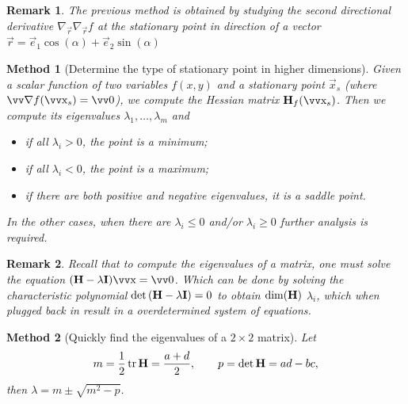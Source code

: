 \documentclass[twocolumn, margin=normal]{tex/hsrzf}
\theoremstyle{fuvarzf}
\newtheorem{method}{Method}
\newtheorem{remark}{Remark}
\DeclareMathOperator{\tr}{\mathrm{tr}}
\begin{document}
\begin{remark}
  The previous method is obtained by studying the second directional derivative
  \(\nabla_\vec{r}\nabla_\vec{r} f\) at the stationary point in direction of a
  vector \(\vec{r} = \vec{e}_1\cos(\alpha) + \vec{e}_2\sin(\alpha)\)
\end{remark}

\begin{method}[Determine the type of stationary point in higher dimensions]
  Given a scalar function of two variables \(f(x,y)\) and a stationary point
  \(\vec{x}_s\) (where \(\grad f(\vec{x}_s) = \vec{0}\)), we compute the
  Hessian matrix \(\mx{H}_f(\vec{x}_s)\). Then we compute its eigenvalues
  \(\lambda_1, \ldots, \lambda_m\) and
  \begin{itemize}
    \item if all \(\lambda_i > 0\), the point is a minimum;
    \item if all \(\lambda_i < 0\), the point is a maximum;
    \item if there are both positive and negative eigenvalues,
      it is a saddle point.
  \end{itemize}
  In the other cases, when there are \(\lambda_i \leq 0\) and/or \(\lambda_i
  \geq 0\) further analysis is required.
\end{method}

\begin{remark}
  Recall that to compute the eigenvalues of a matrix, one must solve the
  equation \((\mx{H} - \lambda\mx{I})\vec{x} = \vec{0}\). Which can be done
  by solving the characteristic polynomial \(\det\left(\bm{\mathrm{H}} -
  \lambda\bm{\mathrm{I}}\right) = 0\) to obtain \(\dim(\bm{\mathrm{H}})\) \(\lambda_i\), which
  when plugged back in result in a overdetermined system of equations.
\end{remark}

\begin{method}[Quickly find the eigenvalues of a \(2\times 2\) matrix]
  Let
  \[
    m = \frac{1}{2}\tr \mx{H} = \frac{a + d}{2} ,
    \qquad
    p = \det\mx{H} = ad - bc ,
  \]
  then \(\lambda = m \pm \sqrt{m^2 - p}\).
\end{method}
\end{document}
